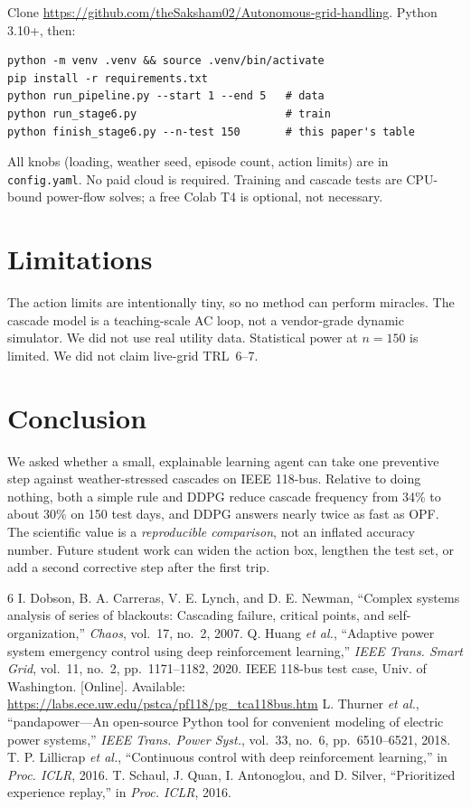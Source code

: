 \documentclass[conference]{IEEEtran}
\begin{document}
Clone \url{https://github.com/theSaksham02/Autonomous-grid-handling}. Python 3.10+, then:

\begin{verbatim}
python -m venv .venv && source .venv/bin/activate
pip install -r requirements.txt
python run_pipeline.py --start 1 --end 5   # data
python run_stage6.py                       # train
python finish_stage6.py --n-test 150       # this paper's table
\end{verbatim}

All knobs (loading, weather seed, episode count, action limits) are in \texttt{config.yaml}. No paid cloud is required. Training and cascade tests are CPU-bound power-flow solves; a free Colab T4 is optional, not necessary.

\section{Limitations}

The action limits are intentionally tiny, so no method can perform miracles. The cascade model is a teaching-scale AC loop, not a vendor-grade dynamic simulator. We did not use real utility data. Statistical power at $n=150$ is limited. We did not claim live-grid TRL~6--7.

\section{Conclusion}

We asked whether a small, explainable learning agent can take one preventive step against weather-stressed cascades on IEEE 118-bus. Relative to doing nothing, both a simple rule and DDPG reduce cascade frequency from 34\% to about 30\% on 150 test days, and DDPG answers nearly twice as fast as OPF. The scientific value is a \emph{reproducible comparison}, not an inflated accuracy number. Future student work can widen the action box, lengthen the test set, or add a second corrective step after the first trip.

\begin{thebibliography}{6}
 I. Dobson, B. A. Carreras, V. E. Lynch, and D. E. Newman, ``Complex systems analysis of series of blackouts: Cascading failure, critical points, and self-organization,'' \textit{Chaos}, vol.~17, no.~2, 2007.
 Q. Huang \textit{et al.}, ``Adaptive power system emergency control using deep reinforcement learning,'' \textit{IEEE Trans. Smart Grid}, vol.~11, no.~2, pp.~1171--1182, 2020.
 IEEE 118-bus test case, Univ. of Washington. [Online]. Available: \url{https://labs.ece.uw.edu/pstca/pf118/pg_tca118bus.htm}
 L. Thurner \textit{et al.}, ``pandapower---An open-source Python tool for convenient modeling of electric power systems,'' \textit{IEEE Trans. Power Syst.}, vol.~33, no.~6, pp.~6510--6521, 2018.
 T. P. Lillicrap \textit{et al.}, ``Continuous control with deep reinforcement learning,'' in \textit{Proc. ICLR}, 2016.
 T. Schaul, J. Quan, I. Antonoglou, and D. Silver, ``Prioritized experience replay,'' in \textit{Proc. ICLR}, 2016.
\end{thebibliography}
\end{document}
